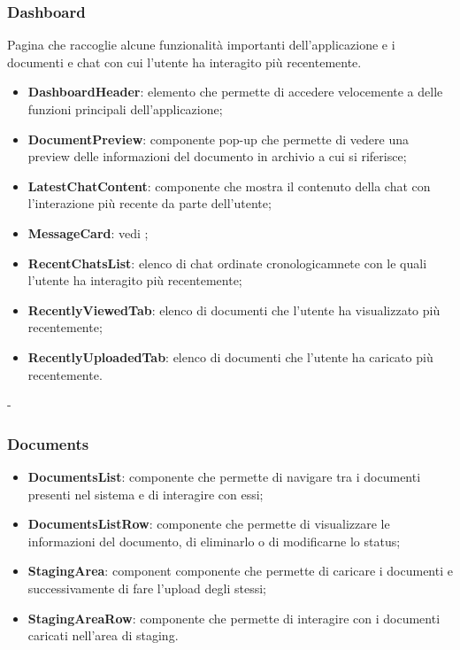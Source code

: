 \documentclass[10pt, a4paper]{article}
\begin{document}
    \subsubsection{Dashboard}
    Pagina che raccoglie alcune funzionalità importanti dell'applicazione e i documenti e chat con cui l'utente ha interagito più recentemente.
    \begin{itemize}
        \item \label{DashboardHeader}\textbf{DashboardHeader}: elemento che permette di accedere velocemente a delle funzioni principali dell'applicazione;
        \item \label{DocumentPreview}\textbf{DocumentPreview}: componente pop-up che permette di vedere una preview delle informazioni del documento in archivio a cui si riferisce;       
        \item \label{LatestChatContent}\textbf{LatestChatContent}: componente che mostra il contenuto della chat con l'interazione più recente da parte dell'utente;
        \item \textbf{MessageCard}: vedi ; 
        \item \label{RecentChatsList}\textbf{RecentChatsList}: elenco di chat ordinate cronologicamnete con le quali l'utente ha interagito più recentemente;
        \item \label{RecentlyViewedTab}\textbf{RecentlyViewedTab}: elenco di documenti che l'utente ha visualizzato più recentemente;
        \item \label{RecentlyUploadedTab}\textbf{RecentlyUploadedTab}: elenco di documenti che l'utente ha caricato più recentemente.
       
    \end{itemize}
     -
    




\subsubsection{Documents}
\begin{itemize}
    \item \label{DocumentsList}\textbf{DocumentsList}: componente che permette di navigare tra i documenti presenti nel sistema e di interagire con essi; 
    \item \label{DocumentsListRow}\textbf{DocumentsListRow}: componente che permette di visualizzare le informazioni del documento, di eliminarlo o di modificarne lo status;
    \item \label{StagingArea}\textbf{StagingArea}: component componente che permette di caricare i documenti e successivamente di fare l'upload degli stessi;
    \item \label{StagingAreaRow}\textbf{StagingAreaRow}: componente che permette di interagire con i documenti caricati nell'area di staging.
    
\end{itemize}
\end{document}
